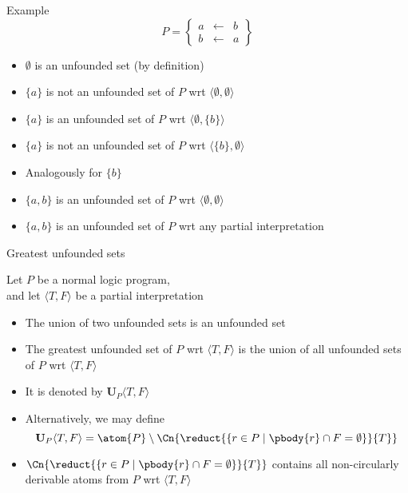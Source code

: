 \begin{frame}{Example}
%
\[
P
=
\left\{
  \begin{array}{lcl}
    a &\leftarrow & b \\
    b &\leftarrow & a
  \end{array}
\right\}
\]
\begin{itemize}
\item<2-> $\emptyset$ is an unfounded set (by definition)
\smallskip
\item<3-> $\{a\}$ is not an unfounded set of $P$ wrt $\langle\emptyset,\emptyset\rangle$
\item<4-> $\{a\}$ is     an unfounded set of $P$ wrt $\langle\emptyset,\{b\}\rangle$
\item<5-> $\{a\}$ is not an unfounded set of $P$ wrt $\langle\{b\},\emptyset\rangle$
\smallskip
\item<6> Analogously for $\{b\}$
\smallskip
\item<7-> $\{a,b\}$ is     an unfounded set of $P$ wrt $\langle\emptyset,\emptyset\rangle$
\item<8-> $\{a,b\}$ is     an unfounded set of $P$ wrt any partial interpretation
\end{itemize}

\end{frame}
\begin{frame}{Greatest unfounded sets}\label{unf:greatest}

Let $P$ be a normal logic program,\\ and let
$\langle T,F \rangle$ be a partial interpretation

\begin{itemize}
\item<2->  The union of two unfounded sets is an unfounded set
\item<3-> The \alert{greatest unfounded set} of $P$ wrt $\langle T,F \rangle$ is the
  union of all unfounded sets of $P$ wrt $\langle T,F \rangle$
\item<4-> [] It is denoted by $\mathbf{U}_P\langle T,F \rangle$
\item<5-> Alternatively, we may define
  \[
  \mathbf{U}_P\langle T,F \rangle =
  \atom{P} \setminus
  \Cn{\reduct{\{r \in P \mid \pbody{r} \cap F = \emptyset\}}{T}}\/
  \]
\item<6-> 
  \(
  \Cn{\reduct{\{r \in P \mid \pbody{r} \cap F = \emptyset\}}{T}}
  \)
  contains all non-circularly derivable atoms from $P$ wrt $\langle T,F \rangle$
\end{itemize}
\end{frame}
